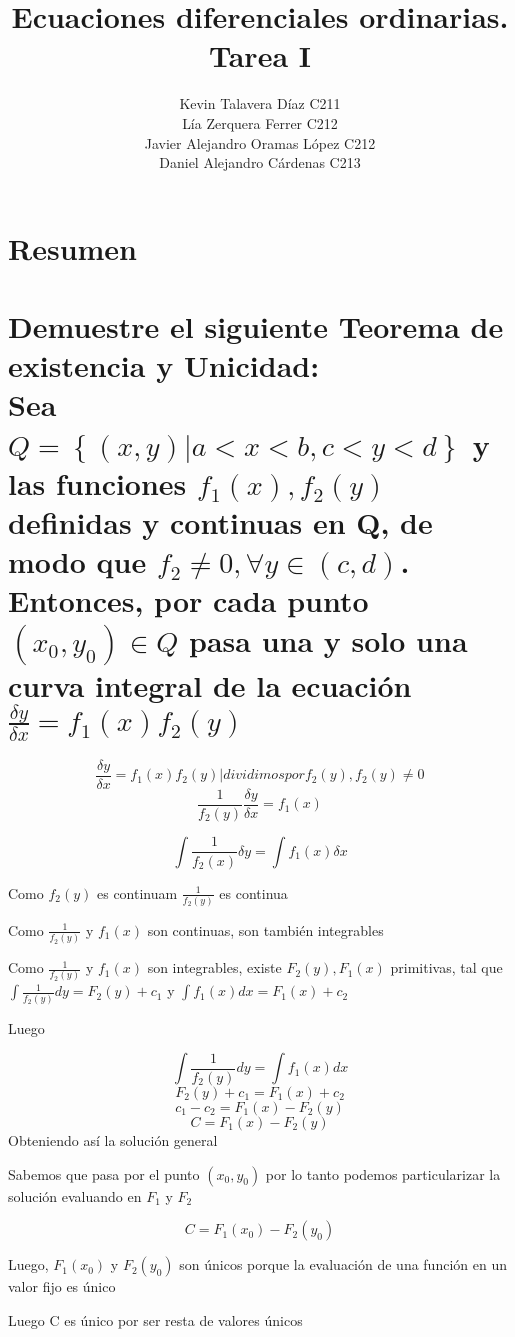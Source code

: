 \documentclass{article}
\title{Ecuaciones diferenciales ordinarias. Tarea I}
\author{
    Kevin Talavera Díaz C211\\
    Lía Zerquera Ferrer C212\\
    Javier Alejandro Oramas López C212\\
    Daniel Alejandro Cárdenas C213\\
    }
\date{}
\begin{document}
    \maketitle

    \section{Resumen}


    \section{Demuestre el siguiente Teorema de existencia y Unicidad:\\
        Sea $Q = \left\{ (x,y) | a < x < b, c < y < d \right\}$ y las funciones $f_{1}(x),f_{2}(y)$ definidas y continuas en Q, 
        de modo que $f_2 \not= 0, \forall y \in (c,d)$. Entonces, por cada punto $ (x_0, y_0) \in Q $ pasa una y solo una curva 
        integral de la ecuación $\frac{\delta y}{\delta x} = f_{1}(x)f_{2}(y)$}

        \[\frac{\delta y}{\delta x} = f_1(x)f_2(y) | dividimos por f_2(y), f_2(y) \not = 0  \]
        \[\frac{1}{f_2(y)}\frac{\delta y}{\delta x} = f_1(x)\]

        \[\int \frac{1}{f_2(x)} \delta y = \int f_1(x) \delta x\]
        
        Como $f_2(y)$ es continuam $\frac{1}{f_2(y)}$ es continua
        
        Como $\frac{1}{f_2(y)}$ y $f_1(x)$ son continuas, son también integrables

        Como $\frac{1}{f_2(y)}$ y $f_1(x)$ son integrables, existe $F_2(y), F_1(x)$ primitivas, 
        tal que $ \int \frac{1}{f_2(y)} dy = F_2(y) + c_1$ y $ \int f_1(x) dx =  F_1(x) +c_2$ 

        Luego

        \[\int \frac{1}{f_2(y)} dy = \int f_1(x) dx \]
        \[F_2(y) + c_1 = F_1(x) + c_2\]
        \[c_1 - c_2 = F_1(x) - F_2(y) \]
        \[ C = F_1(x) - F_2(y) \]
        Obteniendo así la solución general

        Sabemos que pasa por el punto $(x_0, y_0)$ por lo tanto podemos particularizar la 
        solución evaluando en $F_1$ y $F_2$

        \[C = F_1(x_0)-F_2(y_0)\]

        Luego, $F_1(x_0)$ y $F_2(y_0)$ son únicos porque la evaluación de una función en un valor fijo es único

        Luego C es único por ser resta de valores únicos
\end{document}
